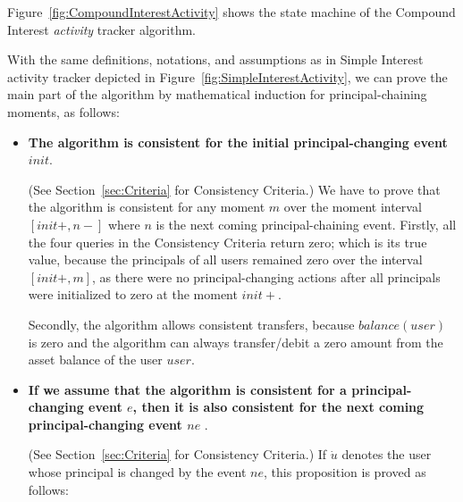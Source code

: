 \documentclass{article}
\begin{document}
Figure~\ref{fig:CompoundInterestActivity} shows the state machine of the 
Compound Interest \textit{activity} tracker algorithm.

With the same definitions, notations, and assumptions as in Simple Interest 
activity tracker depicted in Figure~\ref{fig:SimpleInterestActivity},
we can prove the main part of the algorithm by mathematical induction for 
principal-chaining moments, as follows:

\begin{itemize}
  \item \textbf{The algorithm is consistent for the initial principal-changing 
  event $init$}.

  (See Section~\ref{sec:Criteria} for Consistency Criteria.)
  We have to prove that the algorithm is consistent for any moment $m$ over 
  the moment interval $[init+, n-]$ where $n$ is the next coming principal-chaining 
  event.
  Firstly, all the four queries in the Consistency Criteria 
  return zero; which is its true value, because the principals of all users  
  remained zero over the interval $[init+, m]$, as there were no 
  principal-changing actions after all principals were initialized 
  to zero at the moment $init+$.

  Secondly, the algorithm allows consistent transfers, because $balance(user)$ is 
  zero and the algorithm can always transfer/debit a zero amount 
  from the asset balance of the user $user$. 

  \item \textbf{If we assume that the algorithm is consistent for a principal-changing 
  event $e$, then it is also consistent for the next coming principal-changing event $ne$ }.

  (See Section~\ref{sec:Criteria} for Consistency Criteria.) 
  If $\dot u$ denotes the user whose principal is changed by the event $ne$, 
  this proposition is proved as follows:\\

  \begin{itemize}


\end{itemize}
\end{itemize}
\end{document}
